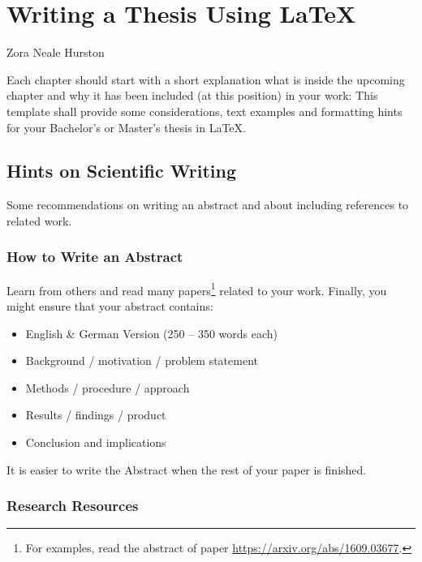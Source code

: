 \chapter{Writing a Thesis Using \LaTeX{} }
\label{chap:info_REMOVE_ME}
\chapterstart

          {Zora Neale Hurston}

Each chapter should start with a short explanation what is inside the
upcoming chapter and why it has been included (at this position) in your
work: This template shall provide some considerations, text examples and
formatting hints for your Bachelor's or Master's thesis in \LaTeX{}.


\section{Hints on Scientific Writing}

Some recommendations on writing an abstract and about including references to
related work.

\subsection{How to Write an Abstract}

Learn from others and read many papers\footnote{For examples, read the
abstract of paper \url{https://arxiv.org/abs/1609.03677}.} related to your
work. Finally, you might ensure that your abstract contains:

	\begin{itemize}
		\item English \& German Version (250 – 350 words each)
		\item Background / motivation / problem statement
		\item Methods / procedure / approach
		\item Results / findings / product
		\item Conclusion and implications
	\end{itemize}

It is easier to write the Abstract when the rest of your paper is finished.

\subsection{Research Resources}



